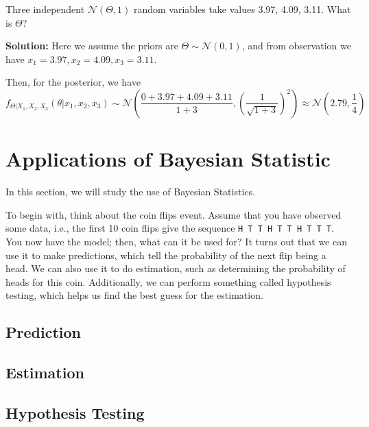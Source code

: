 \begin{eg}
  Three independent \(\mathcal{N}(\Theta, 1)\) random variables take values 3.97, 4.09, 3.11. What is \(\Theta\)? 
  
  \textbf{Solution:} 
  Here we assume the priors are \(\Theta \sim \mathcal{N} (0, 1)\), and from observation we have \(x_1 = 3.97, x_2 = 4.09, x_3 = 3.11\). 

  Then, for the posterior, we have 
  \[
    f_{\Theta \vert X_1, X_2, X_3} (\theta \vert x_1, x_2, x_3) \sim \mathcal{N} \left(\dfrac{0 + 3.97 + 4.09 + 3.11}{1 + 3}, \left(\dfrac{1}{\sqrt{1 + 3}}\right)^2\right) \approx \mathcal{N} (2.79, \dfrac{1}{4})
  \]
\end{eg}

\section{Applications of Bayesian Statistic}
In this section, we will study the use of Bayesian Statistics.

To begin with, think about the coin flips event. Assume that you have observed some data, i.e., the first 10 coin flips give the sequence \verb|H T T H T T H T T T|. You now have the model; then, what can it be used for? It turns out that we can use it to make predictions, which tell the probability of the next flip being a head. We can also use it to do estimation, such as determining the probability of heads for this coin. Additionally, we can perform something called hypothesis testing, which helps us find the best guess for the estimation.

\subsection{Prediction} 

\subsection{Estimation}

\subsection{Hypothesis Testing}

